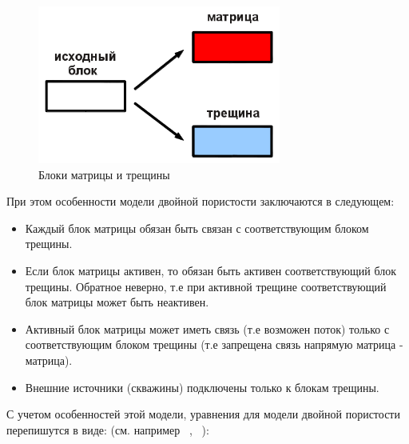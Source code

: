 \documentclass[12pt,a4paper]{article}
\begin{document}
\begin{figure}[!h]
\begin{center}
\caption{Блоки матрицы и трещины}
\includegraphics[width=8cm]{pics/matrixfracture.png}
\end{center}
\label{DPblocks}
\end{figure}


При этом особенности модели двойной пористости заключаются в следующем: 

\begin{itemize}
\item Каждый блок матрицы обязан быть связан с соответствующим блоком трещины.

\item Если блок матрицы активен, то обязан быть активен соответствующий блок трещины. Обратное неверно, т.е при активной трещине соответствующий блок матрицы может быть неактивен.

\item Активный блок матрицы может иметь связь (т.е возможен поток) только с соответствующим блоком трещины (т.е запрещена связь  напрямую матрица - матрица).

\item Внешние источники (скважины) подключены только к блокам трещины.
\end{itemize}

С учетом особенностей этой модели, уравнения для модели двойной пористости перепишутся в виде: (см. например ~\cite{Aziz}, ~\cite{Chen}): 
\end{document}
